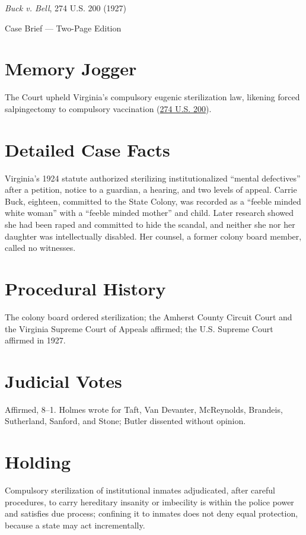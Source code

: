 \documentclass[12pt]{article}
\begin{document}
\begin{center}
{\LARGE \textit{Buck v. Bell}, 274 U.S. 200 (1927)\par}
\vspace{0.5em}
{\large Case Brief --- Two-Page Edition\par}
\end{center}

\section{Memory Jogger}
The Court upheld Virginia's compulsory eugenic sterilization law, likening forced salpingectomy to compulsory vaccination (\href{https://supreme.justia.com/cases/federal/us/274/200/}{274 U.S. 200}).

\section{Detailed Case Facts}
Virginia's 1924 statute authorized sterilizing institutionalized ``mental defectives'' after a petition, notice to a guardian, a hearing, and two levels of appeal. Carrie Buck, eighteen, committed to the State Colony, was recorded as a ``feeble minded white woman'' with a ``feeble minded mother'' and child. Later research showed she had been raped and committed to hide the scandal, and neither she nor her daughter was intellectually disabled. Her counsel, a former colony board member, called no witnesses.

\section{Procedural History}
The colony board ordered sterilization; the Amherst County Circuit Court and the Virginia Supreme Court of Appeals affirmed; the U.S. Supreme Court affirmed in 1927.

\section{Judicial Votes}
Affirmed, 8--1. Holmes wrote for Taft, Van Devanter, McReynolds, Brandeis, Sutherland, Sanford, and Stone; Butler dissented without opinion.

\section{Holding}
Compulsory sterilization of institutional inmates adjudicated, after careful procedures, to carry hereditary insanity or imbecility is within the police power and satisfies due process; confining it to inmates does not deny equal protection, because a state may act incrementally.
\end{document}
